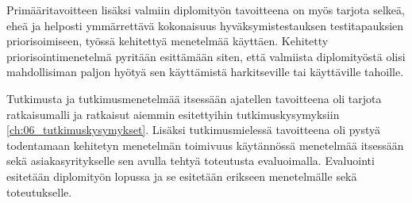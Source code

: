   Primääritavoitteen lisäksi valmiin diplomityön tavoitteena on myös tarjota selkeä, eheä ja helposti ymmärrettävä kokonaisuus hyväksymistestauksen testitapauksien priorisoimiseen, työssä kehitettyä menetelmää käyttäen.
  Kehitetty priorisointimenetelmä pyritään esittämään siten, että valmiista diplomityöstä olisi mahdollisiman paljon hyötyä sen käyttämistä harkitseville tai käyttäville tahoille.

  Tutkimusta ja tutkimusmenetelmää itsessään ajatellen tavoitteena oli tarjota ratkaisumalli ja ratkaisut aiemmin esitettyihin tutkimuskysymyksiin \ref{ch:06_tutkimuskysymykset}.
  Lisäksi tutkimusmielessä tavoitteena oli pystyä todentamaan kehitetyn menetelmän toimivuus käytännössä menetelmää itsessään sekä asiakasyritykselle sen avulla tehtyä toteutusta evaluoimalla.
  Evaluointi esitetään diplomityön lopussa ja se esitetään erikseen menetelmälle sekä toteutukselle.
